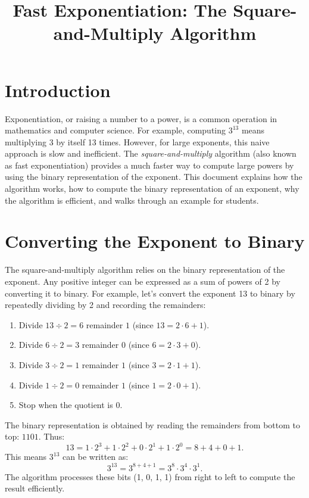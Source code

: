 \documentclass{article}
\begin{document}
    \title{Fast Exponentiation: The Square-and-Multiply Algorithm}
    \author{}
    \date{}
    \maketitle

    \section{Introduction}
    Exponentiation, or raising a number to a power, is a common operation in mathematics and computer science. For example, computing \(3^{13}\) means multiplying 3 by itself 13 times. However, for large exponents, this naive approach is slow and inefficient. The \emph{square-and-multiply} algorithm (also known as fast exponentiation) provides a much faster way to compute large powers by using the binary representation of the exponent. This document explains how the algorithm works, how to compute the binary representation of an exponent, why the algorithm is efficient, and walks through an example for students.

    \section{Converting the Exponent to Binary}
    The square-and-multiply algorithm relies on the binary representation of the exponent. Any positive integer can be expressed as a sum of powers of 2 by converting it to binary. For example, let’s convert the exponent 13 to binary by repeatedly dividing by 2 and recording the remainders:

    \begin{enumerate}
        \item Divide \(13 \div 2 = 6\) remainder \(1\) (since \(13 = 2 \cdot 6 + 1\)).
        \item Divide \(6 \div 2 = 3\) remainder \(0\) (since \(6 = 2 \cdot 3 + 0\)).
        \item Divide \(3 \div 2 = 1\) remainder \(1\) (since \(3 = 2 \cdot 1 + 1\)).
        \item Divide \(1 \div 2 = 0\) remainder \(1\) (since \(1 = 2 \cdot 0 + 1\)).
        \item Stop when the quotient is 0.
    \end{enumerate}

    The binary representation is obtained by reading the remainders from bottom to top: \(1101\). Thus:
    \[
        13 = 1 \cdot 2^3 + 1 \cdot 2^2 + 0 \cdot 2^1 + 1 \cdot 2^0 = 8 + 4 + 0 + 1.
    \]
    This means \(3^{13}\) can be written as:
    \[
        3^{13} = 3^{8 + 4 + 1} = 3^8 \cdot 3^4 \cdot 3^1.
    \]
    The algorithm processes these bits (1, 0, 1, 1) from right to left to compute the result efficiently.
\end{document}
